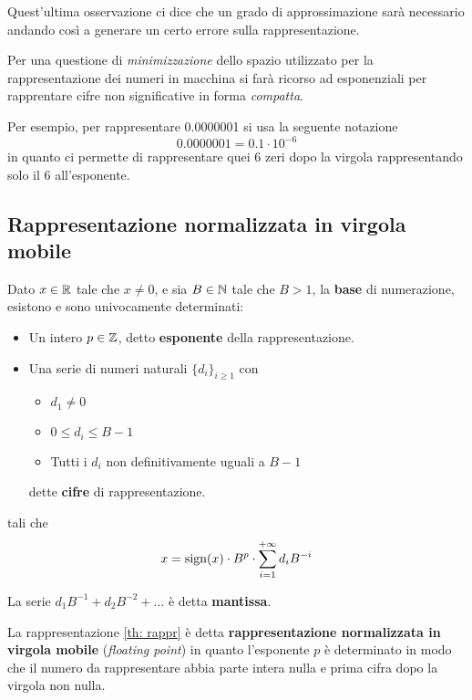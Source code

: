 Quest'ultima osservazione ci dice che un grado di approssimazione sarà necessario andando così a generare un
certo errore sulla rappresentazione.

Per una questione di \emph{minimizzazione} dello spazio utilizzato per la rappresentazione dei numeri in
macchina si farà ricorso ad esponenziali per rapprentare cifre non significative in forma \emph{compatta}.

\begin{example}
	Per esempio, per rappresentare 0.0000001 si usa la seguente notazione
	\[ 0.0000001 = 0.1 \cdot 10^{-6} \]
	in quanto ci permette di rappresentare quei 6 zeri dopo la virgola rappresentando solo il 6 all'esponente.
\end{example}

\subsection{Rappresentazione normalizzata in virgola mobile}
\begin{theorem}[Rappresentazione]\label{th: rappr}
	Dato $x \in \mathbb{R}$ tale che $x \neq 0$, e sia $B \in \mathbb{N}$ tale che $B > 1$, la \textbf{base} di numerazione,
	esistono e sono univocamente determinati:
	\begin{itemize}
		\item Un intero $p \in \mathbb{Z}$, detto \textbf{esponente} della rappresentazione.
		\item Una serie di numeri naturali $\{ d_i \}_{i \geq 1}$ con
		      \begin{itemize}
			      \item $d_1 \neq 0$
			      \item $0 \leq d_i \leq B - 1$
			      \item Tutti i $d_i$ non definitivamente uguali a $B - 1$
		      \end{itemize}
		      dette \textbf{cifre} di rappresentazione.
	\end{itemize}
	tali che
	\[ x = \operatorname{sign}(x) \cdot B^p \cdot \sum_{i=1}^{+\infty} d_i B^{-i} \]
\end{theorem}

\begin{definition}
	La serie $d_1 B^{-1} + d_2 B^{-2} + \dots$ è detta \textbf{mantissa}.
\end{definition}

La rappresentazione \ref{th: rappr} è detta \textbf{rappresentazione normalizzata in virgola mobile}
(\emph{floating point}) in quanto l'esponente $p$ è determinato in modo che il numero da rappresentare abbia
parte intera nulla e prima cifra dopo la virgola non nulla.

